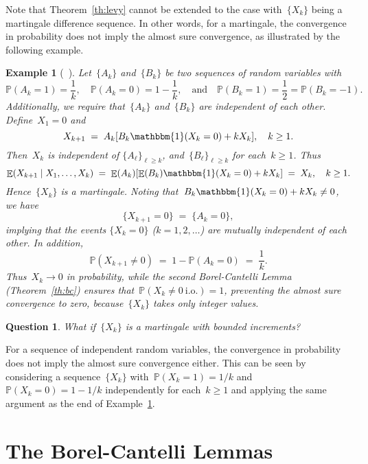 \documentclass[12pt,a4paper]{article}  %
\newcounter{cite}
\newtheorem{example}{Example}[section]
\newtheorem{question}{Question}[section]
\theoremstyle{definition}
\numberwithin{equation}{section}
\newcommand{\ind}{\mathbbm{1}}
\newcommand{\io}{{\text{i.o.}}\xspace}
\newcommand{\iid}{{\text{i.i.d.}}\xspace}
\DeclareMathOperator{\expc}{\mathbb{E}}
\renewcommand{\Pr}{\mathbb{P}}
\begin{document}
Note that Theorem~\ref{th:levy} cannot be extended to the case with~$\{X_k\}$ being a martingale
difference sequence. In other words, for a martingale, the convergence in probability does not imply
the almost sure convergence, as illustrated by the following example.

\begin{example}[\mbox{~\cite[Example 4.2.14]{Durrett_2019}}]
    \label{exp:durret}
    Let~$\{A_k\}$ and~$\{B_k\}$ be two sequences of \iid random variables with
    \[
        \Pr(A_k = 1) = \frac{1}{k}, \quad \Pr(A_k = 0) = 1-\frac{1}{k},
        \quad \text{and} \quad
        \Pr(B_k=1) = \frac{1}{2} = \Pr(B_k = -1).
    \]
    Additionally, we require that~$\{A_k\}$ and~$\{B_k\}$ are independent of each other.
    Define~$X_1 = 0$ and
    \[
        X_{k+1} \;=\;  A_k[B_k \ind(X_k=0) + k X_k], \quad k \ge 1.
    \]
    Then~$X_k$ is independent of $\{A_\ell\}_{\ell \ge k}$, and~$\{B_\ell\}_{\ell\ge k}$  for
    each~$k\ge 1$. Thus
    \[
        \expc(X_{k+1} \mathrel{|} X_1, \ldots, X_k)
        \;=\;
        \expc(A_k) [\expc(B_k) \ind(X_k=0) + k X_k]
        \;=\; X_k, \quad k \ge 1.
    \]
    Hence~$\{X_k\}$ is a martingale. Noting that~$B_k \ind(X_k=0) + k X_k \neq 0$, we have
    \[
        \{X_{k+1} =0\} \;=\; \{A_k = 0\},
    \]
    implying that the events $\{X_k = 0\}$ \textnormal{(}$k = 1, 2, \ldots$\textnormal{)} are mutually
    independent of each other. In addition,
    \[
        \Pr(X_{k+1} \neq 0) \;=\; 1-\Pr(A_k = 0) \;=\;  \frac{1}{k}.
    \]
    Thus~$X_k\to 0$ in probability, while the second Borel-Cantelli Lemma
    \textnormal{(}Theorem~\ref{th:bc}\textnormal{)}
    ensures that~$\Pr(X_k \neq 0~\io) = 1$, preventing the almost sure convergence to zero,
    because~$\{X_k\}$ takes only integer values.
\end{example}

\begin{question}
    What if~$\{X_k\}$ is a martingale with bounded increments?
\end{question}

For a sequence of independent random variables, the convergence in probability does not imply
the  almost sure convergence either. This can be seen by considering a sequence~$\{X_k\}$ with~$\Pr(X_k = 1) = 1/k$
and~$\Pr(X_k = 0) = 1-1/k$ independently for each~$k\ge 1$ and applying the same argument as the
end of Example~\ref{exp:durret}.


\section{The Borel-Cantelli Lemmas}
\label{sec:bc}
\end{document}
